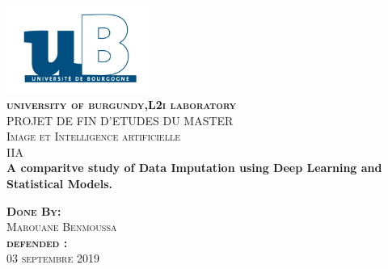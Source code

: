 \begin{titlepage}
\begin{center}

\includegraphics[width=0.35\textwidth]{img/logoUniv}~\\[1cm]

\textsc{\LARGE \bfseries university of burgundy,L2i laboratory }\\[1.1cm]


\textsc{\Large PROJET DE FIN D’ETUDES DU MASTER}\\[0.3cm]

\textsc{\Large Image et Intelligence artificielle }\\[0.2cm]

\textsc{\Large  IIA }\\[0.2cm]

{\huge \bfseries A comparitve study of Data Imputation using Deep Learning and Statistical Models.\\[0.1cm] }


\textsc{\Large \bfseries Done By:}\\%
\textsc{\large Marouane Benmoussa}\\[0.2cm]

\textsc{\Large \bfseries defended :}\\%
\textsc{\large 03 septembre 2019}\\[0.1cm]

%


\end{center}
\end{titlepage}
